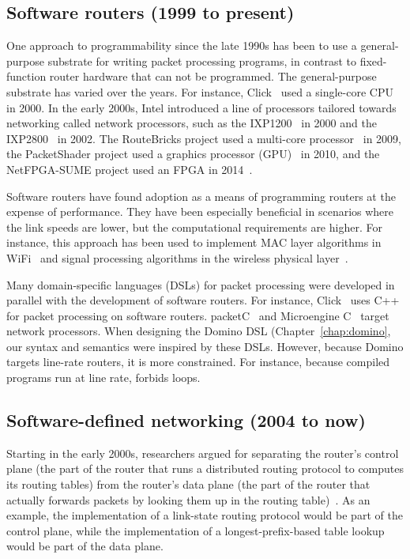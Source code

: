 \subsection{Software routers (1999 to present)}
One approach to programmability since the late 1990s has been to use a
general-purpose substrate for writing packet processing programs, in contrast
to fixed-function router hardware that can not be programmed. The
general-purpose substrate has varied over the years. For instance,
Click~\cite{click} used a single-core CPU in 2000.  In the early 2000s, Intel
introduced a line of processors tailored towards networking called network
processors, such as the IXP1200~\cite{ixp1200} in 2000 and the
IXP2800~\cite{ixp2800} in 2002.  The RouteBricks project used a multi-core
processor~\cite{routebricks} in 2009, the PacketShader project used a graphics
processor (GPU)~\cite{packetshader} in 2010, and the NetFPGA-SUME project used
an FPGA in 2014~\cite{netfpga}.

Software routers have found adoption as a means of programming routers at the
expense of performance. They have been especially beneficial in scenarios where
the link speeds are lower, but the computational requirements are higher.  For
instance, this approach has been used to implement MAC layer algorithms in
WiFi~\cite{samplerate, roofnet, xor} and signal processing algorithms in the
wireless physical layer~\cite{sora, cloudiq}.

Many domain-specific languages (DSLs) for packet processing were developed in
parallel with the development of software routers. For instance,
Click~\cite{click} uses C++ for packet processing on software routers.
packetC~\cite{packetc} and Microengine C~\cite{microenginec} target network
processors. When designing the Domino DSL (Chapter~\ref{chap:domino}, our
syntax and semantics were inspired by these DSLs.  However, because Domino
targets line-rate routers, it is more constrained. For instance, because
compiled programs run at line rate, \pktlanguage forbids loops.


\subsection{Software-defined networking (2004 to now)}
Starting in the early 2000s, researchers argued for separating the router's
control plane (\ie the part of the router that runs a distributed routing
protocol to computes its routing tables) from the router's data plane (\ie the
part of the router that actually forwards packets by looking them up in the
routing table)~\cite{route_control, case_for, forces, fourd, ethane}. As an
example, the implementation of a link-state routing protocol would be part of
the control plane, while the implementation of a longest-prefix-based table
lookup would be part of the data plane.


